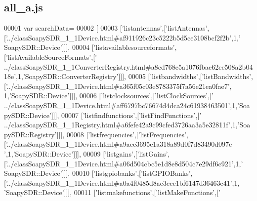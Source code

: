 \subsection{all\+\_\+a.\+js}
\label{all__a_8js_source}

\begin{DoxyCode}
00001 var searchData=
00002 [
00003   [\textcolor{stringliteral}{'listantennas'},[\textcolor{stringliteral}{'listAntennas'},[\textcolor{stringliteral}{'../classSoapySDR\_1\_1Device.html#af911926c23c5222b5d5ce3108bcf2f2b'},1,\textcolor{stringliteral}{'
      SoapySDR::Device'}]]],
00004   [\textcolor{stringliteral}{'listavailablesourceformats'},[\textcolor{stringliteral}{'listAvailableSourceFormats'},[\textcolor{stringliteral}{'
      ../classSoapySDR\_1\_1ConverterRegistry.html#a8cd768e5a1076fbac62ee508a2b0418e'},1,\textcolor{stringliteral}{'SoapySDR::ConverterRegistry'}]]],
00005   [\textcolor{stringliteral}{'listbandwidths'},[\textcolor{stringliteral}{'listBandwidths'},[\textcolor{stringliteral}{'../classSoapySDR\_1\_1Device.html#a365f05c03e8783375f7a56e21ea0fae7'},
      1,\textcolor{stringliteral}{'SoapySDR::Device'}]]],
00006   [\textcolor{stringliteral}{'listclocksources'},[\textcolor{stringliteral}{'listClockSources'},[\textcolor{stringliteral}{'
      ../classSoapySDR\_1\_1Device.html#aff6797bc76674d4dca24c61938463501'},1,\textcolor{stringliteral}{'SoapySDR::Device'}]]],
00007   [\textcolor{stringliteral}{'listfindfunctions'},[\textcolor{stringliteral}{'listFindFunctions'},[\textcolor{stringliteral}{'
      ../classSoapySDR\_1\_1Registry.html#a6fefe42a9c99cfed3726aa3a5e32811f'},1,\textcolor{stringliteral}{'SoapySDR::Registry'}]]],
00008   [\textcolor{stringliteral}{'listfrequencies'},[\textcolor{stringliteral}{'listFrequencies'},[\textcolor{stringliteral}{'../classSoapySDR\_1\_1Device.html#a9aec3695e1a318a89d0f7d83490d097c
      '},1,\textcolor{stringliteral}{'SoapySDR::Device'}]]],
00009   [\textcolor{stringliteral}{'listgains'},[\textcolor{stringliteral}{'listGains'},[\textcolor{stringliteral}{'../classSoapySDR\_1\_1Device.html#a06d504cbc5e1d8e8d504c7e29df6c921'},1,\textcolor{stringliteral}{'
      SoapySDR::Device'}]]],
00010   [\textcolor{stringliteral}{'listgpiobanks'},[\textcolor{stringliteral}{'listGPIOBanks'},[\textcolor{stringliteral}{'../classSoapySDR\_1\_1Device.html#a0a4f0485d8ae3ece1bf6147d36463e41'},1,\textcolor{stringliteral}{
      'SoapySDR::Device'}]]],
00011   [\textcolor{stringliteral}{'listmakefunctions'},[\textcolor{stringliteral}{'listMakeFunctions'},[\textcolor{stringliteral}{'
}
\end{DoxyCode}
